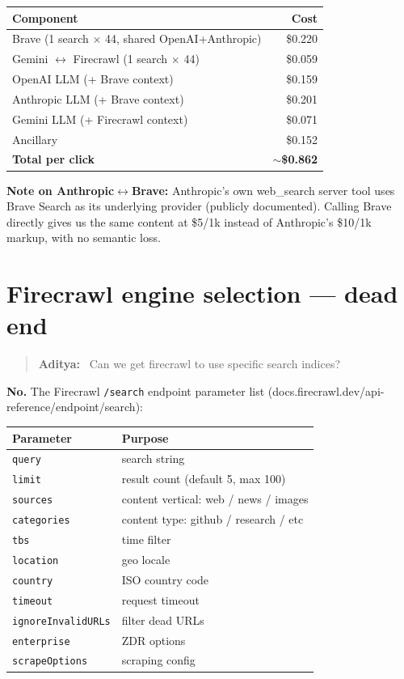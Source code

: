 \documentclass[11pt,letterpaper]{article}
\newenvironment{userturn}
  {\begin{quote}\small\color{brand}\textbf{Aditya:}~}
  {\end{quote}}
\begin{document}
\begin{center}
\begin{tabular}{@{}lr@{}}
\toprule
\textbf{Component} & \textbf{Cost} \\
\midrule
Brave (1 search $\times$ 44, shared OpenAI+Anthropic) & \$0.220 \\
Gemini $\leftrightarrow$ Firecrawl (1 search $\times$ 44)   & \$0.059 \\
OpenAI LLM (+ Brave context)     & \$0.159 \\
Anthropic LLM (+ Brave context)  & \$0.201 \\
Gemini LLM (+ Firecrawl context) & \$0.071 \\
Ancillary & \$0.152 \\
\midrule
\textbf{Total per click} & \textbf{$\sim$\$0.862} \\
\bottomrule
\end{tabular}
\end{center}

\textbf{Note on Anthropic$\leftrightarrow$Brave:} Anthropic's own web\_search
server tool uses Brave Search as its underlying provider (publicly
documented). Calling Brave directly gives us the same content at
\$5/1k instead of Anthropic's \$10/1k markup, with no semantic loss.

\section{Firecrawl engine selection --- dead end}

\begin{userturn}
Can we get firecrawl to use specific search indices?
\end{userturn}

\textbf{No.} The Firecrawl \texttt{/search} endpoint parameter list
(docs.firecrawl.dev/api-reference/endpoint/search):

\begin{center}
\begin{tabular}{@{}ll@{}}
\toprule
\textbf{Parameter} & \textbf{Purpose} \\
\midrule
\texttt{query}            & search string \\
\texttt{limit}            & result count (default 5, max 100) \\
\texttt{sources}          & content vertical: web / news / images \\
\texttt{categories}       & content type: github / research / etc \\
\texttt{tbs}              & time filter \\
\texttt{location}         & geo locale \\
\texttt{country}          & ISO country code \\
\texttt{timeout}          & request timeout \\
\texttt{ignoreInvalidURLs}& filter dead URLs \\
\texttt{enterprise}       & ZDR options \\
\texttt{scrapeOptions}    & scraping config \\
\bottomrule
\end{tabular}
\end{center}
\end{document}
